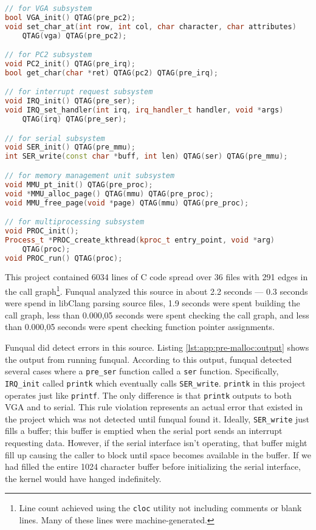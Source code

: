 \noindent\begin{minipage}[t]{\linewidth}
\begin{lstlisting}[language=c++,caption={Lines inserted into C source for a simple kernel in order to prevent subsystems from depending on interfaces not yet initialized.},label={lst:app:pre-malloc:annote}]
// for VGA subsystem
bool VGA_init() QTAG(pre_pc2);
void set_char_at(int row, int col, char character, char attributes)
    QTAG(vga) QTAG(pre_pc2);

// for PC2 subsystem
void PC2_init() QTAG(pre_irq);
bool get_char(char *ret) QTAG(pc2) QTAG(pre_irq);

// for interrupt request subsystem
void IRQ_init() QTAG(pre_ser);
void IRQ_set_handler(int irq, irq_handler_t handler, void *args)
    QTAG(irq) QTAG(pre_ser);

// for serial subsystem
void SER_init() QTAG(pre_mmu);
int SER_write(const char *buff, int len) QTAG(ser) QTAG(pre_mmu);

// for memory management unit subsystem
void MMU_pt_init() QTAG(pre_proc);
void *MMU_alloc_page() QTAG(mmu) QTAG(pre_proc);
void MMU_free_page(void *page) QTAG(mmu) QTAG(pre_proc);

// for multiprocessing subsystem
void PROC_init();
Process_t *PROC_create_kthread(kproc_t entry_point, void *arg)
    QTAG(proc);
void PROC_run() QTAG(proc);
\end{lstlisting}
\end{minipage}

This project contained 6034 lines of C code spread over 36 files with 291 edges in the call graph\footnote{Line count achieved using the \lstinline{cloc} utility not including comments or blank lines.  Many of these lines were machine-generated.}.  Funqual analyzed this source in about 2.2 seconds --- 0.3 seconds were spend in libClang parsing source files, 1.9 seconds were spent building the call graph, less than 0.000,05 seconds were spent checking the call graph, and less than 0.000,05 seconds were spent checking function pointer assignments.  

Funqual did detect errors in this source.  Listing \ref{lst:app:pre-malloc:output} shows the output from running funqual.  According to this output, funqual detected several cases where a \lstinline{pre_ser} function called a \lstinline{ser} function.  Specifically, \lstinline{IRQ_init} called \lstinline{printk} which eventually calls \lstinline{SER_write}.  \lstinline{printk} in this project operates just like \lstinline{printf}.  The only difference is that \lstinline{printk} outputs to both VGA and to serial.  This rule violation represents an actual error that existed in the project which was not detected until funqual found it.  Ideally, \lstinline{SER_write} just fills a buffer; this buffer is emptied when the serial port sends an interrupt requesting data.  However, if the serial interface isn't operating, that buffer might fill up causing the caller to block until space becomes available in the buffer.  If we had filled the entire 1024 character buffer before initializing the serial interface, the kernel would have hanged indefinitely.

